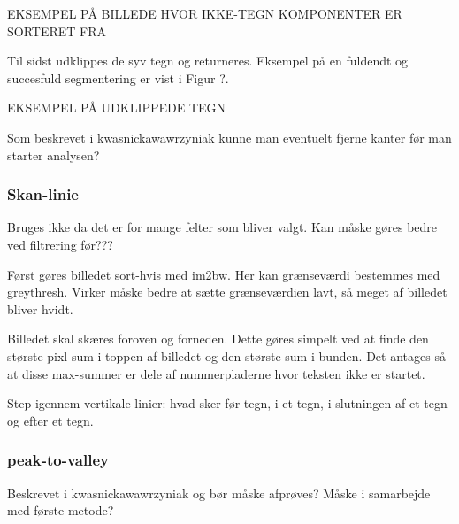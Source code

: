 EKSEMPEL PÅ BILLEDE HVOR IKKE-TEGN KOMPONENTER ER SORTERET FRA

Til sidst udklippes de syv tegn og returneres. Eksempel på en fuldendt og succesfuld segmentering er vist i Figur ?.

EKSEMPEL PÅ UDKLIPPEDE TEGN

Som beskrevet i kwasnickawawrzyniak kunne man eventuelt fjerne kanter før man starter analysen?

\subsubsection{Skan-linie}
Bruges ikke da det er for mange felter som bliver valgt. Kan måske gøres bedre ved filtrering før???

Først gøres billedet sort-hvis med im2bw. Her kan grænseværdi bestemmes med greythresh. Virker måske bedre at sætte grænseværdien lavt, så meget af billedet bliver hvidt.

Billedet skal skæres foroven og forneden. Dette gøres simpelt ved at finde den største pixl-sum i toppen af billedet og den største sum i bunden. Det antages så at disse max-summer er dele af nummerpladerne hvor teksten ikke er startet.

Step igennem vertikale linier: hvad sker før tegn, i et tegn, i slutningen af et tegn og efter et tegn.

\subsubsection{peak-to-valley}

Beskrevet i kwasnickawawrzyniak og bør måske afprøves? Måske i samarbejde med første metode?

